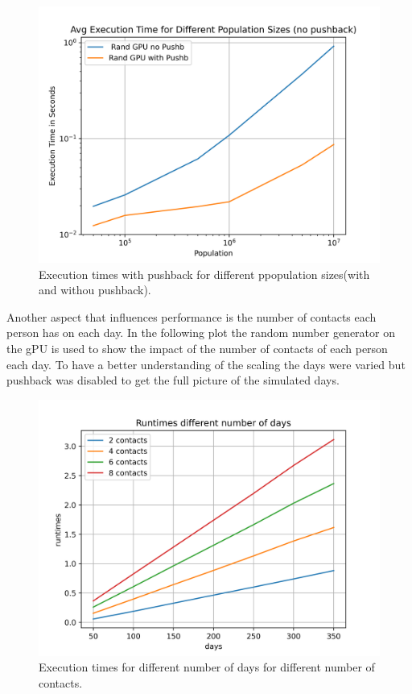 \documentclass[12pt,a4paper]{article}
\begin{document}
\begin{figure}[H]
    \centering
    \includegraphics[width=12cm]{../Population_no_push.png}
    \caption{Execution times with pushback for different ppopulation sizes(with and withou pushback).}
    \label{fig:population_no_push}
\end{figure}

Another aspect that influences performance is the number of contacts each person has on each day. In the following plot the random number generator on the gPU is used to show the impact of the number of contacts of each person each day. To have a better understanding of the scaling the days were varied but pushback was disabled to get the full picture of the simulated days. 
\begin{figure}[H]
  \centering
  \includegraphics[width=12cm]{../contacts.png}
  \caption{Execution times for different number of days for  different number of contacts.}
  \label{fig:contacts}
\end{figure}
\end{document}
